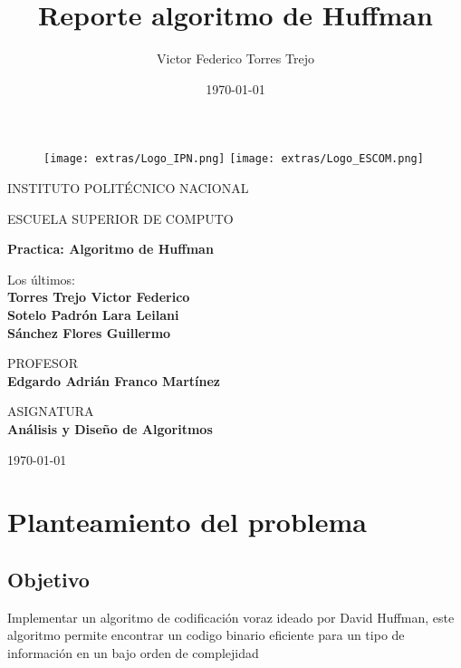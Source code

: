 \documentclass[12 pt]{report}
\title{Reporte algoritmo de Huffman}
\author{Victor Federico Torres Trejo}
\date{\today}
\begin{document}
\thispagestyle{empty}

\begin{figure}[ht]
  \texttt{[image: extras/Logo\_IPN.png]}
  \label{EscudoIPN}
  \endminipage
  \texttt{[image: extras/Logo\_ESCOM.png]}
  \label{EscudoESCOM}
  \endminipage
\end{figure}

\begin{center}
  \vspace{0.8cm}
  \LARGE
  INSTITUTO POLITÉCNICO NACIONAL
  
  \vspace{0.8cm}
  \LARGE
  ESCUELA SUPERIOR DE COMPUTO
  
  \vspace{1.5cm}	
  \Large
  \textbf{Practica: Algoritmo de Huffman}

  \vspace{1.0cm}
  \normalsize	
  Los últimos:  \\
  \vspace{.3cm}
  \large
  \textbf{Torres Trejo Victor Federico \\ Sotelo Padrón Lara Leilani \\ Sánchez Flores Guillermo}
  
  \vspace{1cm}
  \normalsize	
  PROFESOR \\
  \vspace{.3cm}
  \large
  \textbf{Edgardo Adrián Franco Martínez}

  \vspace{1cm}
  \normalsize

  \vspace{1cm}
  \normalsize	
  ASIGNATURA \\
  \vspace{.3cm}
  \large
  \textbf{Análisis y Diseño de Algoritmos}
\end{center}
\vspace{1cm}
\today




\tableofcontents
\chapter{Planteamiento del problema}

\section{Objetivo}
Implementar un algoritmo de codificación voraz ideado por David Huffman, este algoritmo permite encontrar un codigo binario eficiente para un tipo de información en un bajo orden de complejidad
\end{document}
